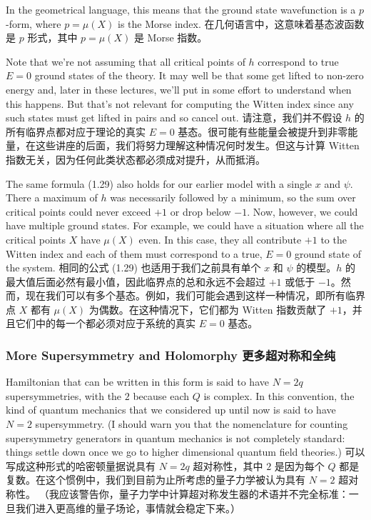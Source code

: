 \documentclass{article}
\newcommand{\SakuraiYukiko}{\emoji{cherry-blossom}\emoji{snowflake}}
\begin{document}
In the geometrical language, this means that the ground state wavefunction is a $p$-form, where $p = \mu(X)$ is the Morse index.
在几何语言中，这意味着基态波函数是 $p$ 形式，其中 $p = \mu(X)$ 是 Morse 指数。

Note that we're not assuming that all critical points of $h$ correspond to true $E = 0$ ground states of the theory. It may well be that some get lifted to non-zero energy and, later in these lectures, we'll put in some eﬀort to understand when this happens. But that's not relevant for computing the Witten index since any such states must get lifted in pairs and so cancel out.
请注意，我们并不假设 $h$ 的所有临界点都对应于理论的真实 $E = 0$ 基态。很可能有些能量会被提升到非零能量，在这些讲座的后面，我们将努力理解这种情况何时发生。但这与计算 Witten 指数无关，因为任何此类状态都必须成对提升，从而抵消。

The same formula (1.29) also holds for our earlier model with a single $x$ and $\psi$. There a maximum of $h$ was necessarily followed by a minimum, so the sum over critical points could never exceed $+ 1$ or drop below $- 1$. Now, however, we could have multiple ground states. For example, we could have a situation where all the critical points $X$ have $\mu(X)$ even. In this case, they all contribute $+ 1$ to the Witten index and each of them must correspond to a true, $E = 0$ ground state of the system.
相同的公式 (1.29) 也适用于我们之前具有单个 $x$ 和 $\psi$ 的模型。$h$ 的最大值后面必然有最小值，因此临界点的总和永远不会超过 $+ 1$ 或低于 $- 1$。然而，现在我们可以有多个基态。例如，我们可能会遇到这样一种情况，即所有临界点 $X$ 都有 $\mu(X)$ 为偶数。在这种情况下，它们都为 Witten 指数贡献了 $+ 1$，并且它们中的每一个都必须对应于系统的真实 $E = 0$ 基态。

\subsubsection{More Supersymmetry and Holomorphy \SakuraiYukiko 更多超对称和全纯}

Hamiltonian that can be written in this form is said to have $N = 2 q$ supersymmetries, with the $2$ because each $Q$ is complex. In this convention, the kind of quantum mechanics that we considered up until now is said to have $N = 2$ supersymmetry. (I should warn you that the nomenclature for counting supersymmetry generators in quantum mechanics is not completely standard: things settle down once we go to higher dimensional quantum field theories.)
可以写成这种形式的哈密顿量据说具有 $N = 2 q$ 超对称性，其中 $2$ 是因为每个 $Q$ 都是复数。在这个惯例中，我们到目前为止所考虑的量子力学被认为具有 $N = 2$ 超对称性。 （我应该警告你，量子力学中计算超对称发生器的术语并不完全标准：一旦我们进入更高维的量子场论，事情就会稳定下来。）
\end{document}
